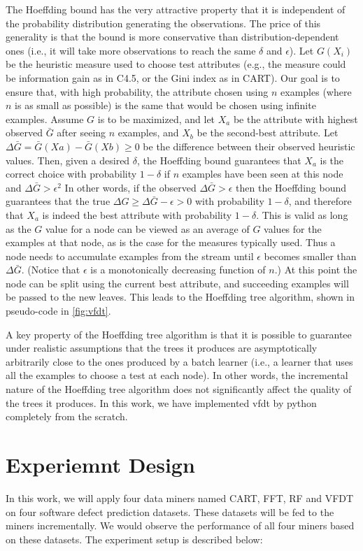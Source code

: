 \documentclass[sigplan]{acmart}\settopmatter{printfolios=true,printccs=false,printacmref=false}
\begin{document}
The Hoeffding bound has the very attractive property that it is independent of the probability distribution generating the observations. The price of this generality is that the bound is more conservative than distribution-dependent ones (i.e., it will take more observations to reach the same $\delta$ and $\epsilon$). Let $G(X_i)$ be the heuristic measure used to choose test attributes (e.g., the measure could be information gain as in C4.5, or the Gini index as in CART). Our goal is to ensure that, with high probability, the attribute chosen using $n$ examples (where $n$ is as small as possible) is the same that would be chosen using infinite examples. Assume $G$ is to be maximized, and let $X_a$ be the attribute with highest observed $\bar{G}$ after seeing $n$ examples, and $X_b$ be the second-best attribute. Let $\Delta \bar{G} = \bar{G}(Xa) - \bar{G}(Xb) \ge 0$ be the difference between their observed heuristic values. Then, given a desired $\delta$, the Hoeffding bound guarantees that $X_a$ is the correct choice with probability $1 - \delta$ if $n$ examples have been seen at this node and $\Delta \bar{G} > \epsilon^2$ In other words, if the observed $\Delta \bar{G} > \epsilon$ then the Hoeffding bound guarantees that the true $\Delta G \ge \Delta \bar{G} - \epsilon > 0$ with probability $1 - \delta$, and therefore that $X_a$ is indeed the best attribute with probability $1 - \delta$. This is valid as long as the $G$ value for a node can be viewed as an average of $G$ values for the examples at that node, as is the case for the measures typically used. Thus a node needs to accumulate examples from the stream until $\epsilon$ becomes smaller than $\Delta \bar{G}$. (Notice that $\epsilon$ is a monotonically decreasing function of $n$.) At this point the node can be split using the current best attribute, and succeeding examples will be passed to the new leaves. This leads to the Hoeffding tree algorithm, shown in pseudo-code in \ref{fig:vfdt}.


A key property of the Hoeffding tree algorithm is that it is possible to guarantee under realistic assumptions that the trees it produces are asymptotically arbitrarily close to the ones produced by a batch learner (i.e., a learner that uses all the examples to choose a test at each node). In other words, the incremental nature of the Hoeffding tree algorithm does not significantly affect the quality of the trees it produces. In this work, we have implemented vfdt by python completely from the scratch. 

\section{Experiemnt Design}
In this work, we will apply four data miners named CART, FFT, RF and VFDT on four software defect prediction datasets. These datasets will be fed to the miners incrementally. We would observe the performance of all four miners based on these datasets. The experiment setup is described below:
\end{document}
